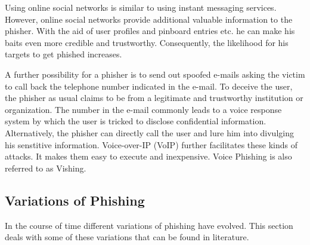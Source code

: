 \begin{description}[leftmargin=0cm]
	\item[Online Social Networks] Using online social networks is similar to using instant messaging services. However, online social networks provide additional valuable information to the phisher. With the aid of user profiles and pinboard entries etc. he can make his baits even more credible and trustworthy. Consequently, the likelihood for his targets to get phished increases.
	\item[Voice Phishing] A further possibility for a phisher is to send out spoofed e-mails asking the victim to call back the telephone number indicated in the e-mail. To deceive the user, the phisher as usual claims to be from a legitimate and trustworthy institution or organization. The number in the e-mail commonly leads to a voice response system by which the user is tricked to disclose confidential information. Alternatively, the phisher can directly call the user and lure him into divulging his senstitive information. Voice-over-IP (VoIP) further facilitates these kinds of attacks. It makes them easy to execute and inexpensive. Voice Phishing is also referred to as Vishing.
\end{description}

\subsection{Variations of Phishing}
In the course of time different variations of phishing have evolved. This section deals with some of these variations that can be found in literature.
\label{s:phishing_variations}

